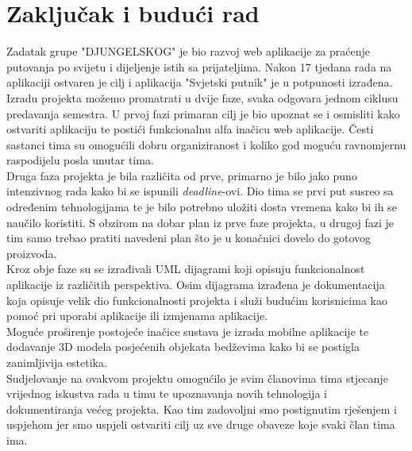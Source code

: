 \chapter{Zaključak i budući rad}
		
		
		

            Zadatak grupe "DJUNGELSKOG" je bio razvoj web aplikacije za praćenje putovanja po svijetu i dijeljenje istih sa prijateljima. Nakon 17 tjedana rada na aplikaciji ostvaren je cilj i aplikacija "Svjetski putnik" je u potpunosti izrađena.
            \\
            Izradu projekta možemo promatrati u dvije faze, svaka odgovara jednom ciklusu predavanja semestra. U prvoj fazi primaran cilj je bio upoznat se i osmisliti kako ostvariti aplikaciju te postići funkcionalnu alfa inačicu web aplikacije. 
            Česti sastanci tima su omogućili dobru organiziranost i koliko god moguću ravnomjernu raspodijelu posla unutar tima.
            \\
            Druga faza projekta je bila različita od prve, primarno je bilo jako puno intenzivnog rada kako bi se ispunili \textit{deadline}-ovi. Dio tima se prvi put susreo sa određenim tehnologijama te je bilo potrebno uložiti dosta vremena kako bi ih se naučilo koristiti. S obzirom na dobar plan iz prve faze projekta, u drugoj fazi je tim samo trebao pratiti navedeni plan što je u konačnici dovelo do gotovog proizvoda.
            \\
            Kroz obje faze su se izrađivali UML dijagrami koji opisuju funkcionalnost aplikacije iz različitih perspektiva. Osim dijagrama izrađena je dokumentacija koja opisuje velik dio funkcionalnosti projekta i služi budućim korisnicima kao pomoć pri uporabi aplikacije ili izmjenama aplikacije.
            \\
            Moguće proširenje postojeće inačice sustava je izrada mobilne aplikacije te dodavanje 3D modela posjećenih objekata bedževima kako bi se postigla zanimljivija estetika.
            \\
            Sudjelovanje na ovakvom projektu omogućilo je svim članovima tima stjecanje vrijednog iskustva rada u timu te upoznavanja novih tehnologija i dokumentiranja većeg projekta. Kao tim zadovoljni smo postignutim rješenjem i uspjehom jer smo uspjeli ostvariti cilj uz sve druge obaveze koje svaki član tima ima.
            \\
            
		
		\eject  